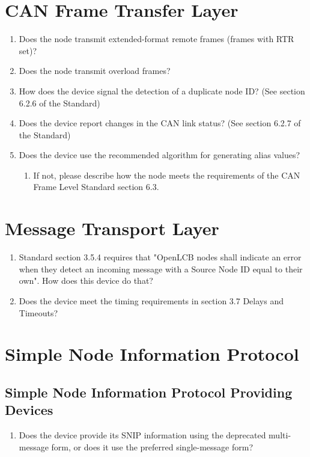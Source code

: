 \section{CAN Frame Transfer Layer}
    \begin{enumerate}
        \item Does the node transmit extended-format remote frames (frames with RTR set)?
        \item Does the node transmit overload frames?
        \item How does the device signal the detection of a duplicate node ID?
                (See section 6.2.6 of the Standard)
        \item Does the device report changes in the CAN link status? 
                (See section 6.2.7 of the Standard)
        \item Does the device use the recommended algorithm for generating alias values?
            \begin{enumerate}
                \item If not, please describe how the node meets the requirements of the 
                    CAN Frame Level Standard section 6.3.
            \end{enumerate}
    \end{enumerate}

\section{Message Transport Layer}
    \begin{enumerate}
        \item Standard section 3.5.4 requires that "OpenLCB nodes shall indicate an 
            error when they detect an incoming message with a Source Node ID
            equal to their own". How does this device do that?
        \item Does the device meet the timing requirements in section 3.7 Delays and Timeouts?
    \end{enumerate}

\section{Simple Node Information Protocol}
    \subsection{Simple Node Information Protocol Providing Devices}
        \begin{enumerate}
            \item Does the device provide its SNIP information using
                the deprecated multi-message form, or does it use
                the preferred single-message form?
        \end{enumerate}
